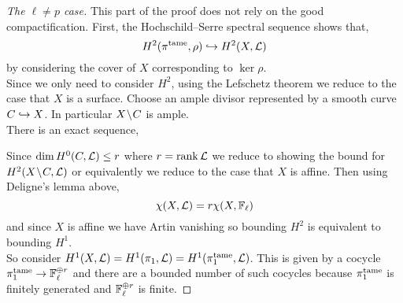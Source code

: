 \documentclass[12pt]{article}
\begin{document}
\begin{proof}[The $\ell \neq p$ case]
This part of the proof does not rely on the good compactification. First, the Hochschild–Serre spectral sequence shows that,
\[ H^2(\pi^{\mathrm{tame}}, \rho) \hookrightarrow H^2(X, \mathcal{L}) \]
by considering the cover of $X$ corresponding to $\ker{\rho}$. 
\bigskip\\
Since we only need to consider $H^2$, using the Lefschetz theorem we reduce to the case that $X$ is a surface. Choose an ample divisor represented by a smooth curve $C \hookrightarrow X$. In particular $X \! \setminus \! C$ is ample. 
\bigskip\\
There is an exact sequence,
\begin{center}
\end{center}
Since $\dim H^0(C, \mathcal{L}) \le r$ where $r = \operatorname{\mathrm{rank}}{\mathcal{L}}$ we reduce to showing the bound for $H^2(X \! \setminus \! C, \mathcal{L})$ or equivalently we reduce to the case that $X$ is affine. Then using Deligne's lemma above,
\[ \chi(X, \mathcal{L}) = r \chi(X, \mathbb{F}_\ell) \]
and since $X$ is affine we have Artin vanishing so bounding $H^2$ is equivalent to bounding $H^1$.
\bigskip\\
So consider $H^1(X, \mathcal{L}) = H^1(\pi_1, \mathcal{L}) = H^1(\pi_1^{\mathrm{tame}}, \mathcal{L})$. This is given by a cocycle $\pi_1^{\mathrm{tame}} \to \mathbb{F}_\ell^{\oplus r}$ and there are a bounded number of such cocycles because $\pi_1^{\mathrm{tame}}$ is finitely generated and $\mathbb{F}_{\ell}^{\oplus r}$ is finite. 
\end{proof}
\end{document}
